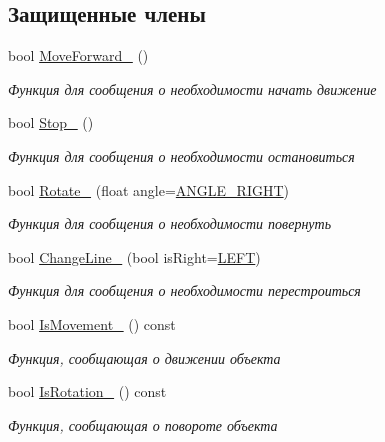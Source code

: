 \subsection*{Защищенные члены}
\begin{DoxyCompactItemize}
\item 
bool \hyperlink{classrtm_1_1_vehicle_object_a017a765353387080952f3ef1657c9463}{Move\+Forward\+\_\+} ()
\begin{DoxyCompactList}\small\item\em Функция для сообщения о необходимости начать движение \end{DoxyCompactList}\item 
bool \hyperlink{classrtm_1_1_vehicle_object_a74dd5fb7b16da79e1d288738ba43ded0}{Stop\+\_\+} ()
\begin{DoxyCompactList}\small\item\em Функция для сообщения о необходимости остановиться \end{DoxyCompactList}\item 
bool \hyperlink{classrtm_1_1_vehicle_object_a0739284311dc651679c0c5954f240758}{Rotate\+\_\+} (float angle=\hyperlink{namespacertm_a39212dd73aa5a6387211cf776bdb64d8}{A\+N\+G\+L\+E\+\_\+\+R\+I\+G\+HT})
\begin{DoxyCompactList}\small\item\em Функция для сообщения о необходимости повернуть \end{DoxyCompactList}\item 
bool \hyperlink{classrtm_1_1_vehicle_object_a73ef7c4f1318bdbe2cd75dc4f07aca4e}{Change\+Line\+\_\+} (bool is\+Right=\hyperlink{namespacertm_a92d29773a54951290dd89f754fb39a8c}{L\+E\+FT})
\begin{DoxyCompactList}\small\item\em Функция для сообщения о необходимости перестроиться \end{DoxyCompactList}\item 
bool \hyperlink{classrtm_1_1_vehicle_object_adcccb796e4b1b404a25512fa8491cd43}{Is\+Movement\+\_\+} () const
\begin{DoxyCompactList}\small\item\em Функция, сообщающая о движении объекта \end{DoxyCompactList}\item 
bool \hyperlink{classrtm_1_1_vehicle_object_a7cb07a20e09d1460ec3d2dd70d62aba2}{Is\+Rotation\+\_\+} () const
\begin{DoxyCompactList}\small\item\em Функция, сообщающая о повороте объекта \end{DoxyCompactList}\item 

\end{DoxyCompactItemize}
